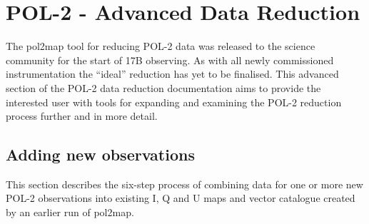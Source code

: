 \chapter{POL-2 - Advanced Data Reduction}
\label{sec:advanced}


The pol2map tool for reducing POL-2 data was released to the science
community for the start of 17B observing. As with all newly
commissioned instrumentation the ``ideal'' reduction has yet to be
finalised. This advanced section of the POL-2 data reduction
documentation aims to provide the interested user with tools for
expanding and examining the POL-2 reduction process further and in
more detail.


\section{Adding new observations}

This section describes the six-step process of combining data for one
or more new POL-2 observations into existing I, Q and U maps and vector
catalogue created by an earlier run of pol2map.

